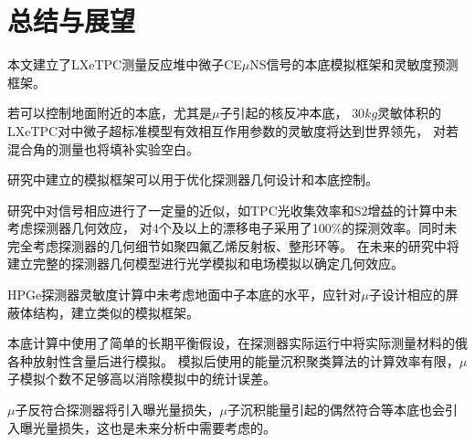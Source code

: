 
\chapter{总结与展望}

本文建立了LXeTPC测量反应堆中微子CE$\mu$NS信号的本底模拟框架和灵敏度预测框架。

若可以控制地面附近的本底，尤其是$\mu$子引起的核反冲本底，
$30\si{kg}$灵敏体积的LXeTPC对中微子超标准模型有效相互作用参数的灵敏度将达到世界领先，
对若混合角的测量也将填补实验空白。

研究中建立的模拟框架可以用于优化探测器几何设计和本底控制。

研究中对信号相应进行了一定量的近似，如TPC光收集效率和$\mathrm{S2}$增益的计算中未考虑探测器几何效应，
对4个及以上的漂移电子采用了100\%的探测效率。同时未完全考虑探测器的几何细节如聚四氟乙烯反射板、整形环等。
在未来的研究中将建立完整的探测器几何模型进行光学模拟和电场模拟以确定几何效应。

HPGe探测器灵敏度计算中未考虑地面中子本底的水平，应针对$\mu$子设计相应的屏蔽体结构，建立类似的模拟框架。

本底计算中使用了简单的长期平衡假设，在探测器实际运行中将实际测量材料的俄各种放射性含量后进行模拟。
模拟后使用的能量沉积聚类算法的计算效率有限，$\mu$子模拟个数不足够高以消除模拟中的统计误差。

$\mu$子反符合探测器将引入曝光量损失，$\mu$子沉积能量引起的偶然符合等本底也会引入曝光量损失，这也是未来分析中需要考虑的。

